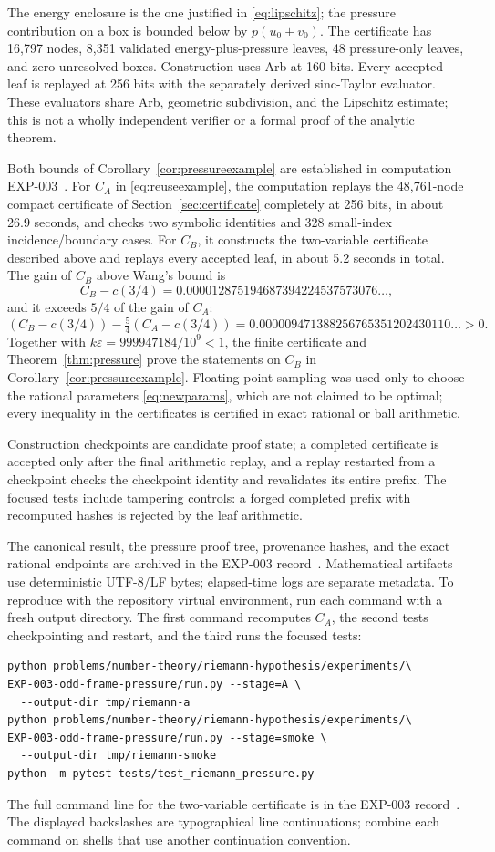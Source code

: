 ﻿\documentclass[11pt]{article}
\theoremstyle{remark}
\begin{document}
The energy enclosure is the one justified in \eqref{eq:lipschitz}; the
pressure contribution on a box is bounded below by $p(u_0+v_0)$.
The certificate has 16,797 nodes, 8,351 validated energy-plus-pressure
leaves, 48 pressure-only leaves, and zero unresolved boxes. Construction
uses Arb at 160 bits. Every accepted leaf is replayed at 256 bits with the
separately derived sinc-Taylor evaluator. These evaluators share Arb,
geometric subdivision, and the Lipschitz estimate; this is not a wholly
independent verifier or a formal proof of the analytic theorem.

Both bounds of Corollary~\ref{cor:pressureexample} are established in
computation EXP-003~\cite{RecordIII}. For $C_A$ in \eqref{eq:reuseexample},
the computation replays the 48,761-node compact certificate of
Section~\ref{sec:certificate} completely at 256 bits, in about 26.9
seconds, and checks two symbolic identities and 328 small-index
incidence\slash boundary cases. For $C_B$, it constructs the two-variable
certificate described above and replays every accepted leaf, in about 5.2
seconds in total. The gain of $C_B$ above Wang's bound is
\[
 C_B-c(3/4)=0.000012875194687394224537573076\ldots,
\]
and it exceeds $5/4$ of the gain of $C_A$:
\[
 (C_B-c(3/4))-\tfrac54(C_A-c(3/4))
 =0.000009471388256765351202430110\ldots>0.
\]
Together with $k\varepsilon=999947184/10^9<1$, the finite certificate and
Theorem~\ref{thm:pressure} prove the statements on $C_B$ in
Corollary~\ref{cor:pressureexample}. Floating-point sampling was used only
to choose the rational parameters \eqref{eq:newparams}, which are not
claimed to be optimal; every inequality in the certificates is certified in
exact rational or ball arithmetic.

Construction checkpoints are candidate proof state; a completed
certificate is accepted only after the final arithmetic replay, and a
replay restarted from a checkpoint checks the checkpoint identity and
revalidates its entire prefix. The focused tests include tampering
controls: a forged completed prefix with recomputed hashes is rejected by
the leaf arithmetic.

The canonical result, the pressure proof tree, provenance hashes, and the
exact rational endpoints are archived in the EXP-003
record~\cite{RecordIII}. Mathematical artifacts use deterministic UTF-8/LF
bytes; elapsed-time logs are separate metadata. To reproduce with the
repository virtual environment, run each command with a fresh output
directory. The first command recomputes $C_A$, the second tests
checkpointing and restart, and the third runs the focused tests:
\begin{verbatim}
python problems/number-theory/riemann-hypothesis/experiments/\
EXP-003-odd-frame-pressure/run.py --stage=A \
  --output-dir tmp/riemann-a
python problems/number-theory/riemann-hypothesis/experiments/\
EXP-003-odd-frame-pressure/run.py --stage=smoke \
  --output-dir tmp/riemann-smoke
python -m pytest tests/test_riemann_pressure.py
\end{verbatim}
The full command line for the two-variable certificate is in the EXP-003
record~\cite{RecordIII}. The displayed backslashes are typographical line
continuations; combine each command on shells that use another
continuation convention.
\end{document}
